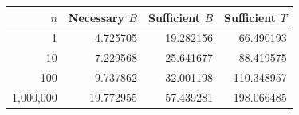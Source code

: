 \begin{tabular}{rrrr}
\toprule
$n$ & Necessary $B$ & Sufficient $B$ & Sufficient $T$\\
\midrule
1 & 4.725705 & 19.282156 & 66.490193 \\
10 & 7.229568 & 25.641677 & 88.419575 \\
100 & 9.737862 & 32.001198 & 110.348957 \\
1,000,000 & 19.772955 & 57.439281 & 198.066485 \\
\bottomrule
\end{tabular}
